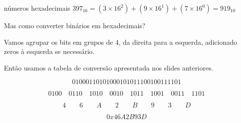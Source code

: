 \documentclass{beamer}
\begin{document}
\begin{frame}{números hexadecimais}
  $397_{16} = (3 \times 16^2) + (9 \times 16^1) + (7 \times 16^0) = 919_{10}$

  \framebreak

  Mas como converter binários em hexadecimais?

  Vamos agrupar os bits em grupos de 4, da direita para a esquerda,
  adicionado zeros à esquerda se necessário.

  Então usamos a tabela de conversão apresentada nos slides
  anteriores.

  \framebreak

  \[ 01000110101000101011100100111101 \]

  \[ 0100 \quad 0110 \quad 1010 \quad 0010 \quad 1011 \quad 1001 \quad 0011 \quad 1101 \]

  \[ 4 \qquad 6 \qquad A \qquad 2 \qquad B \qquad 9 \qquad 3 \qquad D \]

  \[ 0x46A2B93D \]

\end{frame}
\end{document}
